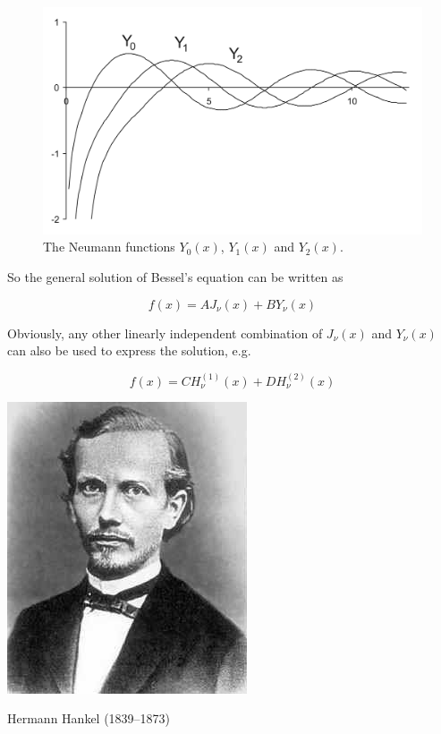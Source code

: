 \begin{figure}
\centering
\includegraphics{bessel/figures/y}
\caption{The Neumann functions $Y_0(x)$, $Y_1(x)$ and $Y_2(x)$.}
\label{fig-bessel-Y}
\end{figure}

So the general solution of Bessel's equation can be written as

\begin{equation}
f(x) = A J_{\nu}(x) + B Y_{\nu}(x)
\end{equation} 

Obviously, any other linearly independent combination of $J_{\nu}(x)$ and $Y_{\nu}(x)$ can also be used to express the solution, e.g.

\begin{equation}
f(x) = C H_{\nu}^{(1)}(x) + D H_{\nu}^{(2)}(x)
\end{equation} 

\begin{marginfigure}[-1cm]
  \includegraphics{bessel/figures/h_hankel}
  \caption{Hermann Hankel (1839–1873)}
\end{marginfigure}

